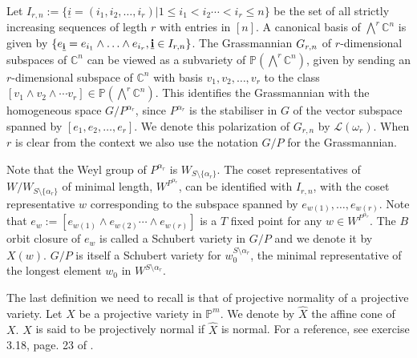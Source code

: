 Let $I_{r,n}:=\{{ \underline{i}} =(i_1,i_2,\ldots,i_r) |  1\leq i_1 < i_2 \cdots < i_r \leq n \}$ be the set of all strictly increasing sequences of legth $r$ with entries in $[n]$. 
 A canonical basis of $\bigwedge^r{\mathbb C}^n$ is given by $\{e_{\bf \underline{i}} = e_{i_1} \wedge \ldots \wedge e_{i_r}, {\bf \underline{i}} \in I_{r,n}\}$. The Grassmannian $G_{{r},{n}}$ of $r$-dimensional subspaces of ${\mathbb C}^n$ can be viewed as a subvariety of ${\mathbb P}(\bigwedge^r {\mathbb C}^n)$,
given by sending an $r$-dimensional
subspace of ${\mathbb C}^n$ with basis $v_1,v_2,\ldots,v_r$ to the class $[v_1 \wedge v_2 \wedge \cdots v_r] \in {\mathbb P}(\bigwedge^r {\mathbb C}^n)$. This identifies the Grassmannian  with the homogeneous space  $G/P^{\alpha_r}$, since  $P^{\alpha_r}$ is the  stabiliser in $G$ of the vector subspace spanned by $[e_1,e_2, \ldots,e_r]$. We denote this polarization of $G_{r,n}$ by ${\mathcal L}(\omega_r)$. When $r$ is clear from the context we also use the notation $G/P$ for the Grassmannian.

Note that the Weyl group of  $P^{\alpha_r}$ is  $W_{S\setminus \{\alpha_r\}}$. The coset representatives of $W/W_{S\setminus \{\alpha_r\}}$  of minimal length, $W^{P^{\alpha_r}}$, can be identified with $I_{r,n}$, with the coset representative $w$ corresponding to the subspace spanned by ${e_{w(1)},\ldots,e_{w(r)}}$. Note that $e_w := [e_{w(1)} \wedge e_{w(2)} \cdots \wedge e_{w(r)}]$  is a $T$ fixed point for any $w \in W^{P^{\alpha_r}}$. The $B$ orbit closure of $e_{w}$ is called a Schubert variety in $G/P$ and we denote it
by $X(w)$. $G/P$ is itself a Schubert variety for $w_0^{S \setminus \alpha_r}$, the minimal representative of the longest element $w_0$ in $W^{S \setminus \alpha_r}$.   

The last definition we need to recall is that of projective normality of a projective variety.
Let $X$ be a projective variety in $\mathbb{P}^{m}.$ We denote by $\hat{X}$ the affine cone of $X.$  $X$ is said to be projectively normal if $\hat{X}$ is normal. For a reference, see exercise 3.18, page. 23 of \cite{hart1977alggeo}.  

